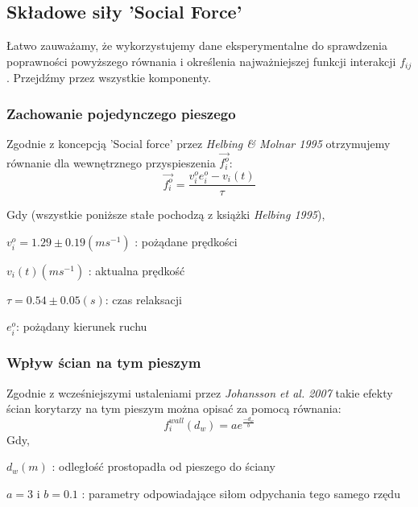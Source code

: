 \subsection{Składowe siły 'Social Force'}
\hspace{4ex}Łatwo zauważamy, że wykorzystujemy dane eksperymentalne do sprawdzenia poprawności powyższego równania i określenia najważniejszej funkcji interakcji $f_{ij}$. Przejdźmy przez wszystkie komponenty.
\subsubsection{Zachowanie pojedynczego pieszego}
\hspace{4ex}Zgodnie z koncepcją 'Social force' przez {\it Helbing \& Molnar 1995} otrzymujemy równanie dla wewnętrznego przyspieszenia $\vec{f_i^o}$:
$$\vec{f_{i}^{o}} = \frac{v_i^oe_i^o-v_{i}(t)}{\tau}$$

Gdy (wszystkie poniższe stałe pochodzą z książki {\it Helbing  1995}),\\ \centerline{$v_i^o = 1.29 \pm 0.19(ms^{-1})$ : pożądane prędkości}
\centerline{$v_i(t) (ms^{-1})$ : aktualna prędkość}
\centerline{$\tau = 0.54 \pm 0.05(s)$: czas relaksacji}
\centerline{$e_i^o$: pożądany kierunek ruchu}
\subsubsection{Wpływ ścian na tym pieszym}
\hspace{4ex}Zgodnie z wcześniejszymi ustaleniami przez {\it Johansson et al. 2007} takie efekty ścian korytarzy na tym pieszym można opisać za pomocą równania:
$$
f_i^{wall}(d_w) = ae^{\frac{-d_w}{b}}
$$
Gdy, \\
\centerline{$d_w (m)$ : odległość prostopadła od pieszego do ściany}
\centerline{$a = 3$ i $b = 0.1$ : parametry odpowiadające siłom odpychania tego samego rzędu}
